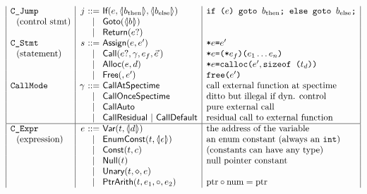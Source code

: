 \begin{docpart}
\begin{figure}
\begin{center}
\[\begin{array}{|l|r@{~}c@{~}l|l|}
\syntax{C\_Jump}& j &::=& \cons{If}(e,\coreXref{b_{\mathrm{then}}},
                                \coreXref{b_{\mathrm{else}}})
        & \syntax{if (}e\syntax{) goto }b_{\mathrm{then}}
          \syntax{; else goto }b_{\mathrm{else}}\syntax{;} \\
\mbox{~~(control stmt)}&&|& \cons{Goto}(\coreXref b) & \\
                &   & | & \cons{Return}(e?) & \\
\syntax{C\_Stmt}    & s &::=& \cons{Assign}(e,e') & \syntax{*}e\syntax{=}e' \\
\mbox{~~(statement)}&   & | & \cons{Call}(e?,\gamma,e_f,\vec e\,)
        & \syntax{*}e\syntax{=(*}e_f\syntax{)(}\avec{e}\syntax{)} \\
                    &   & | & \cons{Alloc}(e,d)
        & \syntax{*}e\syntax{=calloc(}e',\syntax{sizeof (}t_d\syntax{))} \\
                    &   & | & \cons{Free}(,e')
        & \syntax{free(}e'\syntax{)} \\
\syntax{CallMode}&\gamma&::=& \cons{CallAtSpectime}
                        & \mbox{call external function at spectime} \\
                    &   & | & \cons{CallOnceSpectime}
                        & \mbox{ditto but illegal if dyn. control} \\
                    &   & | & \cons{CallAuto}
                        & \mbox{pure external call} \\
                    &   & | & \cons{CallResidual} ~|~ \cons{CallDefault}
                        & \mbox{residual call to external function} \\
\hline
\syntax{C\_Expr} & e &::=& \cons{Var}(t,\coreXref d)
                                & \mbox{the address of the variable} \\
\mbox{~~(expression)}&&| & \cons{EnumConst}(t,\coreXref\epsilon)
                        & \mbox{an enum constant (always an \syntax{int})} \\
                 &   & | & \cons{Const}(t,c)
                                & \mbox{(constants can have any type)} \\
                 &   & | & \cons{Null}(t)
                                & \mbox{null pointer constant} \\
                 &   & | & \cons{Unary}(t,\diamond,e) & \\
                 &   & | & \cons{PtrArith}(t,e_1,\circ,e_2) 
                                & \mbox{ptr}\circ\mbox{num}=\mbox{ptr} \\

\end{array}\]
\end{center}
\end{figure}
\end{docpart}
